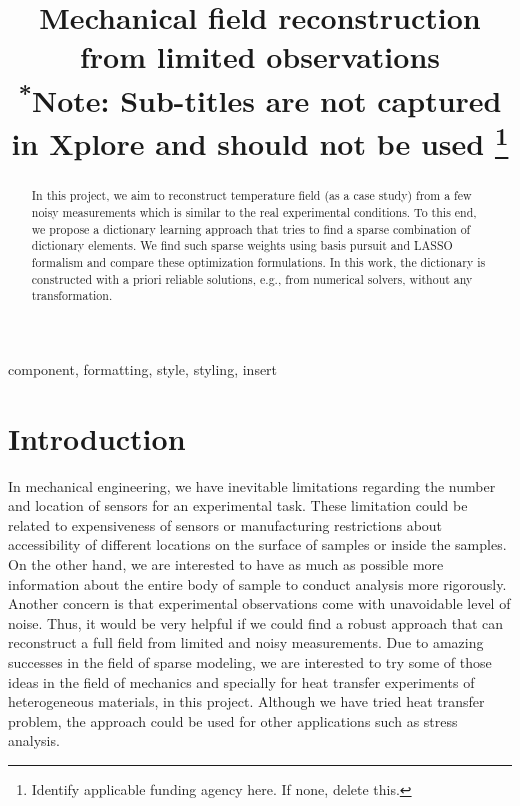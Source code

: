 \documentclass[conference]{IEEEtran}
\begin{document}
\title{Mechanical field reconstruction from limited observations
\\
{\footnotesize \textsuperscript{*}Note: Sub-titles are not captured in Xplore and
should not be used}
\thanks{Identify applicable funding agency here. If none, delete this.}
}

\author{
}

\maketitle

\begin{abstract}
In this project, we aim to reconstruct temperature field (as a case study) from a few noisy measurements which is similar to the real experimental conditions. To this end, we propose a dictionary learning approach that tries to find a sparse combination of dictionary elements. We find such sparse weights using basis pursuit and LASSO formalism and compare these optimization formulations. In this work, the dictionary is constructed with a priori reliable solutions, e.g., from numerical solvers, without any transformation.
\end{abstract}

\begin{IEEEkeywords}
component, formatting, style, styling, insert
\end{IEEEkeywords}

\section{Introduction}
In mechanical engineering, we have inevitable limitations regarding the number and location of sensors for an experimental task. These limitation could be related to expensiveness of  sensors or manufacturing restrictions about accessibility of different locations on the surface of samples or inside the samples. On the other hand, we are interested to have as much as possible more information about the entire body of sample to conduct analysis more rigorously. Another concern is that experimental observations come with unavoidable level of noise. Thus, it would be very helpful if we could find a robust approach that can reconstruct a full field from limited and noisy measurements. Due to amazing successes in the field of sparse modeling, we are interested to try some of those ideas in the field of mechanics and specially for heat transfer experiments of heterogeneous materials, in this project. Although we have tried heat transfer problem, the approach could be used for other applications such as stress analysis.
\end{document}
